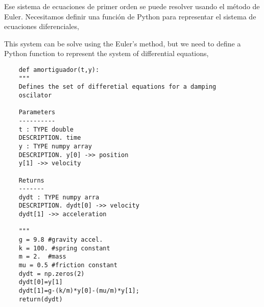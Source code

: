 \begin{paracol}{2}
Ese sistema de ecuaciones de primer orden se puede resolver usando el método de Euler. Necesitamos definir una función de Python para representar el sistema de ecuaciones diferenciales,

\switchcolumn
This system can be solve using the Euler's method, but we need to define a Python function to represent the system of differential equations,
\end{paracol}

\begin{verbatim}
	def amortiguador(t,y):
	"""
	Defines the set of differetial equations for a damping
	oscilator 
	
	Parameters
	----------
	t : TYPE double 
	DESCRIPTION. time
	y : TYPE numpy array
	DESCRIPTION. y[0] ->> position
	y[1] ->> velocity
	
	Returns
	-------
	dydt : TYPE numpy arra
	DESCRIPTION. dydt[0] ->> velocity
	dydt[1] ->> acceleration
	
	"""
	g = 9.8 #gravity accel.
	k = 100. #spring constant
	m = 2.  #mass
	mu = 0.5 #friction constant
	dydt = np.zeros(2) 
	dydt[0]=y[1]
	dydt[1]=g-(k/m)*y[0]-(mu/m)*y[1];
	return(dydt)
\end{verbatim}

